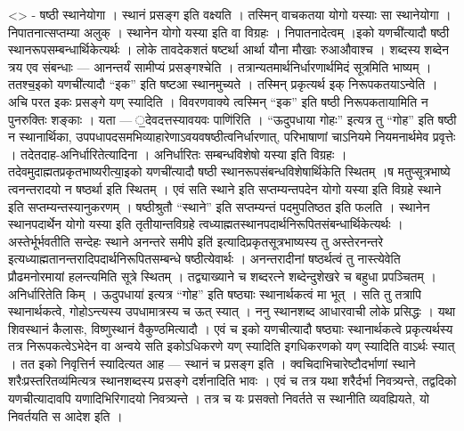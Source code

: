 \textless{}\textgreater{} - षष्ठी स्थानेयोगा । स्थानं प्रसङ्ग इति
वक्ष्यति । तस्मिन् वाचकतया योगो यस्याः सा स्थानेयोगा । निपातनात्सप्तम्या
अलुक् । स्थानेन योगो यस्या इति वा विग्रहः । निपातनादेत्वम् ।इको
यणची॑त्यादौ षष्ठी स्थानरूपसम्बन्धार्थिकेत्यर्थः । लोके तावदेकशतं
षष्टर्था आर्था यौना मौखाः रुआऔवाश्च । शब्दस्य शब्देन त्रय एव संबन्धाः
--- आनन्तर्यं सामीप्यं प्रसङ्गश्चेति । तत्रान्यतमार्थनिर्धारणार्थमिदं
सूत्रमिति भाष्यम् । ततश्च॒इको यणची॑त्यादौ ``इक'' इति षष्टआ स्थानमुच्यते
। तस्मिन् प्रकृत्यर्थ इक् निरूपकतयाऽन्वेति । अचि परत इकः प्रसङ्गे यण्
स्यादिति । विवरणवाक्ये त्वस्मिन् ``इक'' इति षष्ठी निरूपकतायामिति न
पुनरुक्तिः शङ्काः । यता --- ॒देवदत्तस्यावयवः पाणि॑रिति । ``ऊदुपधाया
गोहः'' इत्यत्र तु ``गोह'' इति षष्ठी न स्थानार्थिका,
उपपधापदसमभिव्याहारेणाऽवयवषष्ठीत्वनिर्धारणात्, परिभाषाणां चाऽनियमे
नियमनार्थमेव प्रवृत्तेः । तदेतदाह-अनिर्धारितेत्यादिना । अनिर्धारितः
सम्बन्धविशेषो यस्या इति विग्रहः । तदेवमुदाह्मतप्रकृतभाष्यरीत्या॒इको
यणची॑त्यादौ षष्ठी स्थानरूपसंबन्धविशेषार्थिकेति स्थितम् ।ष
मतुप्सूत्रभाष्ये त्वनन्तरादयो न षष्ठर्था इति स्थितम् । एवं सति स्थाने
इति सप्तम्यन्तपदेन योगो यस्या इति विग्रहे स्थाने इति
सप्तम्यन्तस्यानुकरणम् । षष्ठीश्रुतौ ``स्थाने'' इति सप्तम्यन्तं
पदमुपतिष्ठत इति फलति । स्थानेन स्थानपदार्थेन योगो यस्या इति
तृतीयान्तविग्रहे त्वध्याह्मतस्थानपदार्थनिरूपितसंबन्धार्थिकेत्यर्थः
।अस्तेर्भूर्भवतीति सन्देहः स्थाने अनन्तरे समीपे इति॑
इत्यादिप्रकृतसूत्रभाष्यस्य तु अस्तेरनन्तरे
इत्यध्याह्मतानन्तरादिपदार्थनिरूपितसम्बन्धे षष्ठीत्येवार्थः ।
अनन्तरादीनां षष्ठर्थत्वं तु नास्त्येवेति प्रौढमनोरमायां हलन्त्यमिति
सूत्रे स्थितम् । तद्व्याख्याने च शब्दरत्ने शब्देन्दुशेखरे च बहुधा
प्रपञ्चितम् । अनिर्धारितेति किम् । ऊदुपधाया॑ इत्यत्र ``गोह'' इति
षष्ठ्याः स्थानार्थकत्वं मा भूत् । सति तु तत्रापि स्थानार्थकत्वे,
गोहोऽन्त्यस्य उपधामात्रस्य च ऊत् स्यात् । ननु स्थानशब्द आधारवाची लोके
प्रसिद्धः । यथा शिवस्थानं कैलासः, विष्णुस्थानं वैकुण्ठमित्यादौ । एवं च
इको यणचीत्यादौ षष्ठ्याः स्थानार्थकत्वे प्रकृत्यर्थस्य तत्र
निरूपकत्वेऽभेदेन वा अन्वये सति इकोऽधिकरणे यण् स्यादिति इगधिकरणको यण्
स्यादिति वाऽर्थः स्यात् । तत इको निवृत्तिर्न स्यादित्यत आह --- स्थानं च
प्रसङ्ग इति । क्वचिदाभिचारेष्टौदर्भाणां स्थाने शरैःप्रस्तरितव्य॑मित्यत्र
स्थानशब्दस्य प्रसङ्गे दर्शनादिति भावः । एवं च तत्र यथा शरैर्दर्भा
निवत्र्यन्ते, तद्वदिको यणचीत्यादावपि यणादिभिरिगादयो निवत्र्यन्ते । तत्र
च यः प्रसक्तो निवर्तते स स्थानीति व्यवह्यियते, यो निवर्तयति स आदेश इति ।
